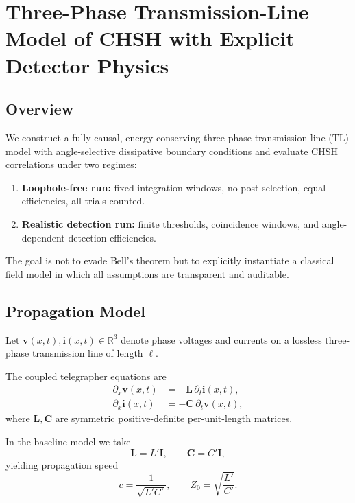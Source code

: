 \section{Three-Phase Transmission-Line Model of CHSH with Explicit Detector Physics}

\subsection{Overview}

We construct a fully causal, energy-conserving three-phase transmission-line (TL) model with angle-selective dissipative boundary conditions and evaluate CHSH correlations under two regimes:

\begin{enumerate}
    \item \textbf{Loophole-free run:} fixed integration windows, no post-selection, equal efficiencies, all trials counted.
    \item \textbf{Realistic detection run:} finite thresholds, coincidence windows, and angle-dependent detection efficiencies.
\end{enumerate}

The goal is not to evade Bell's theorem but to explicitly instantiate a classical field model in which all assumptions are transparent and auditable.

\subsection{Propagation Model}

Let $\mathbf v(x,t), \mathbf i(x,t) \in \mathbb{R}^3$ denote phase voltages and currents on a lossless three-phase transmission line of length $\ell$.

The coupled telegrapher equations are
\begin{align}
\partial_x \mathbf v(x,t) &= -\mathbf L\, \partial_t \mathbf i(x,t), \\
\partial_x \mathbf i(x,t) &= -\mathbf C\, \partial_t \mathbf v(x,t),
\end{align}
where $\mathbf L, \mathbf C$ are symmetric positive-definite per-unit-length matrices.

In the baseline model we take
\begin{equation}
\mathbf L = L' \mathbf I, \qquad \mathbf C = C' \mathbf I,
\end{equation}
yielding propagation speed
\begin{equation}
c = \frac{1}{\sqrt{L'C'}}, \qquad Z_0 = \sqrt{\frac{L'}{C'}}.
\end{equation}

